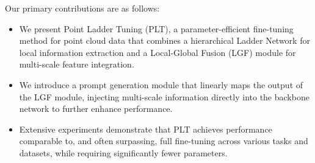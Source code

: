 Our primary contributions are as follows:

\begin{itemize} 
	\item We present Point Ladder Tuning (PLT), a parameter-efficient fine-tuning method for point cloud data that combines a hierarchical Ladder Network for local information extraction and a Local-Global Fusion (LGF) module for multi-scale feature integration. 
	\item We introduce a prompt generation module that linearly maps the output of the LGF module, injecting multi-scale information directly into the backbone network to further enhance performance. \item Extensive experiments demonstrate that PLT achieves performance comparable to, and often surpassing, full fine-tuning across various tasks and datasets, while requiring significantly fewer parameters. 
\end{itemize}



